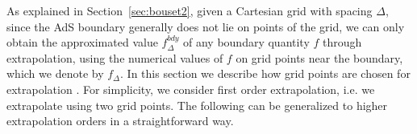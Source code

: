 \documentclass[a4paper,11pt]{article}
\numberwithin{equation}{section}
\begin{document}
As explained in Section~\ref{sec:bouset2}, given a Cartesian grid with spacing $\Delta$, since the AdS boundary generally does not lie on points of the grid, we can only obtain the approximated value $f^{bdy}_{\Delta}$ of any boundary quantity $f$ through extrapolation, using the numerical values of $f$ on grid points near the boundary, which we denote by $f_\Delta$. In this section we describe how grid points are chosen for extrapolation%
. For simplicity, we consider first order extrapolation, i.e. we extrapolate using two grid points. The following can be generalized to higher extrapolation orders in a straightforward way.
\end{document}
